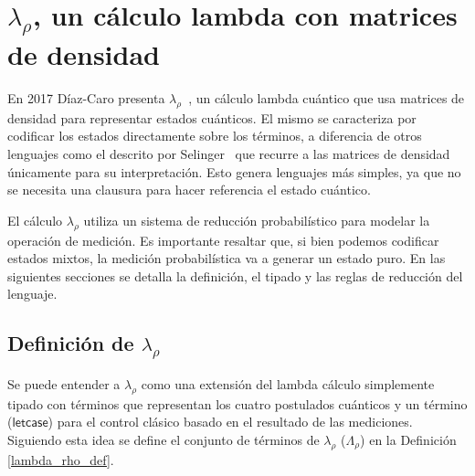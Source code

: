 \section{\texorpdfstring{$\lambda_\rho$, un cálculo lambda con matrices de densidad}{Lambda Rho, un cálculo lambda con matrices de densidad}}\label{sec:lamrho_classic}

En 2017 Díaz-Caro presenta $\lambda_\rho$~\cite{lamrho}, un cálculo lambda cuántico que usa matrices de densidad para representar estados cuánticos. El mismo se caracteriza por codificar los estados directamente sobre los términos, a diferencia de otros lenguajes como el descrito por Selinger~\cite{SelingerMSCS04} que recurre a las matrices de densidad únicamente para su interpretación. Esto genera lenguajes más simples, ya que no se necesita una clausura para hacer referencia el estado cuántico.
 
El cálculo $\lambda_\rho$ utiliza un sistema de reducción probabilístico para modelar la operación de medición. Es importante resaltar que, si bien podemos codificar estados mixtos, la medición probabilística va a generar un estado puro. En las siguientes secciones se detalla la definición, el tipado y las reglas de reducción del lenguaje.

\subsection{\texorpdfstring{Definición de $\lambda_\rho$}{Definición de Lambda Rho}}

Se puede entender a $\lambda_\rho$ como una extensión del lambda cálculo simplemente tipado con términos que representan los cuatro postulados cuánticos y un término ($\textsf{letcase}$) para el control clásico basado en el resultado de las mediciones. Siguiendo esta idea se define el conjunto de términos de $\lambda_\rho$ ($\Lambda_\rho$) en la Definición \ref{lambda_rho_def}.




